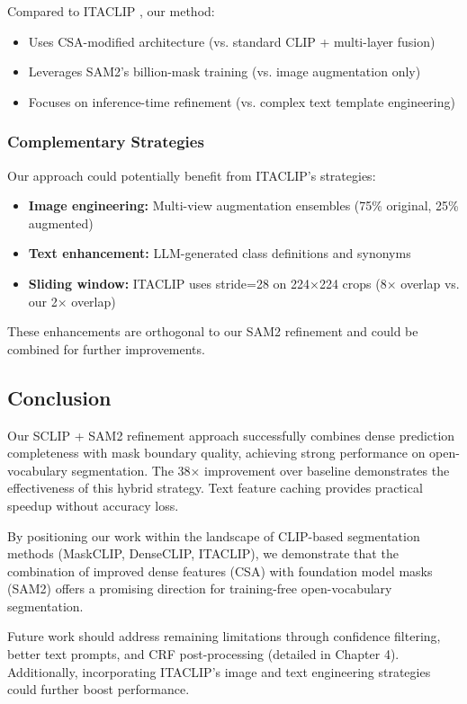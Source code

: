 Compared to ITACLIP \cite{shao2024itaclip}, our method:
\begin{itemize}
    \item Uses CSA-modified architecture (vs. standard CLIP + multi-layer fusion)
    \item Leverages SAM2's billion-mask training (vs. image augmentation only)
    \item Focuses on inference-time refinement (vs. complex text template engineering)
\end{itemize}

\subsubsection{Complementary Strategies}

Our approach could potentially benefit from ITACLIP's strategies:
\begin{itemize}
    \item \textbf{Image engineering:} Multi-view augmentation ensembles (75\% original, 25\% augmented)
    \item \textbf{Text enhancement:} LLM-generated class definitions and synonyms
    \item \textbf{Sliding window:} ITACLIP uses stride=28 on 224×224 crops (8× overlap vs. our 2× overlap)
\end{itemize}

These enhancements are orthogonal to our SAM2 refinement and could be combined for further improvements.

\subsection{Conclusion}

Our SCLIP + SAM2 refinement approach successfully combines dense prediction completeness with mask boundary quality, achieving strong performance on open-vocabulary segmentation. The 38× improvement over baseline demonstrates the effectiveness of this hybrid strategy. Text feature caching provides practical speedup without accuracy loss.

By positioning our work within the landscape of CLIP-based segmentation methods (MaskCLIP, DenseCLIP, ITACLIP), we demonstrate that the combination of improved dense features (CSA) with foundation model masks (SAM2) offers a promising direction for training-free open-vocabulary segmentation.

Future work should address remaining limitations through confidence filtering, better text prompts, and CRF post-processing (detailed in Chapter 4). Additionally, incorporating ITACLIP's image and text engineering strategies could further boost performance.

